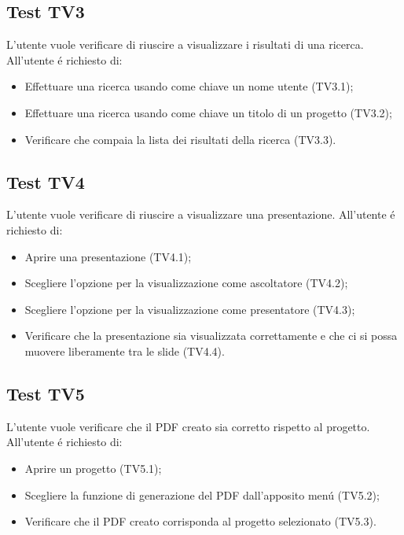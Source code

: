 \subsection{Test TV3}
L'utente vuole verificare di riuscire a visualizzare i risultati di una ricerca. \newline
All'utente \'e richiesto di:
\begin{itemize}
	\item Effettuare una ricerca usando come chiave un nome utente (TV3.1);
	\item Effettuare una ricerca usando come chiave un titolo di un progetto (TV3.2);
	\item Verificare che compaia la lista dei risultati della ricerca (TV3.3).
\end{itemize}

\subsection{Test TV4}
L'utente vuole verificare di riuscire a visualizzare una presentazione. \newline
All'utente \'e richiesto di:
\begin{itemize}
	\item Aprire una presentazione (TV4.1);
	\item Scegliere l'opzione per la visualizzazione come ascoltatore (TV4.2);
	\item Scegliere l'opzione per la visualizzazione come presentatore (TV4.3);
	\item Verificare che la presentazione sia visualizzata correttamente e che ci si possa muovere liberamente tra le slide (TV4.4).
\end{itemize}

\subsection{Test TV5}
L'utente vuole verificare che il PDF creato sia corretto rispetto al progetto. \newline
All'utente \'e richiesto di:
\begin{itemize}
	\item Aprire un progetto (TV5.1);
	\item Scegliere la funzione di generazione del PDF dall'apposito men\'u (TV5.2);
	\item Verificare che il PDF creato corrisponda al progetto selezionato (TV5.3).
\end{itemize}

